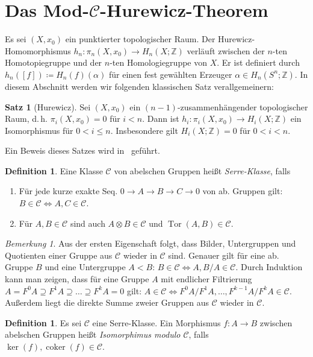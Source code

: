 \documentclass[11pt, a4paper, german]{article}
\theoremstyle{definition}
\newtheorem{satz}[lem]{Satz}
\newtheorem{defn}[lem]{Definition}
\theoremstyle{remark}
\newtheorem*{bem}{Bemerkung}
\newcommand{\Z}{\mathbb{Z}} %
\DeclareMathOperator{\coker}{coker} %
\DeclareMathOperator{\Tor}{Tor} %
\newcommand{\SC}{\mathcal{C}} %
\renewcommand{\dh}{d.\,h.} %
\begin{document}
\section{Das Mod-$\SC$-Hurewicz-Theorem}

Es sei $(X, x_0)$ ein punktierter topologischer Raum.
Der Hurewicz-Homomorphismus $h_n : \pi_n(X, x_0) \to H_n(X; \Z)$ verläuft zwischen der $n$-ten Homotopiegruppe und der $n$-ten Homologiegruppe von $X$.
Er ist definiert durch $h_n([f]) \coloneqq H_n(f)(\alpha)$ für einen fest gewählten Erzeuger $\alpha \in H_n(S^n; \Z)$.
In diesem Abschnitt werden wir folgenden klassischen Satz verallgemeinern:

\begin{satz}[Hurewicz]
  Sei $(X, x_0)$ ein $(n{-}1)$-zusammenhängender topologischer Raum, \dh{} $\pi_i(X, x_0) = 0$ für $i < n$.
  Dann ist $h_i : \pi_i(X, x_0) \to H_i(X; \Z)$ ein Isomorphismus für $0 < i \leq n$.
  Insbesondere gilt $H_i(X; \Z) = 0$ für $0 < i < n$.
\end{satz}

Ein Beweis dieses Satzes wird in~\cite[\mbox{}4.32]{hatcher:at} geführt.

\begin{defn}\label{serre-class}
  Eine Klasse $\SC$ von abelschen Gruppen heißt \emph{Serre-Klasse}, falls
  \begin{enumerate}
    \item Für jede kurze exakte Seq. $0 \to A \to B \to C \to 0$ von ab. Gruppen gilt: $B \in \SC \Leftrightarrow A, C \in \SC$.
    \item Für $A, B \in \SC$ sind auch $A \otimes B \in \SC$ und $\Tor(A, B) \in \SC$.
  \end{enumerate}
\end{defn}

\begin{bem}
  Aus der ersten Eigenschaft folgt, dass Bilder, Untergruppen und Quotienten einer Gruppe aus $\SC$ wieder in $\SC$ sind.
  Genauer gilt für eine ab. Gruppe $B$ und eine Untergruppe $A < B$: $B \in \SC \iff A, B/A \in \SC$.
  Durch Induktion kann man zeigen, dass für eine Gruppe $A$ mit endlicher Filtrierung
  $A = F^0 A \supseteq F^1 A \supseteq \ldots \supseteq F^k A = 0$
  gilt: $A \in \SC \iff F^0 A / F^1 A, \ldots, F^{k-1} A / F^k A \in \SC$.
  Außerdem liegt die direkte Summe zweier Gruppen aus $\SC$ wieder in $\SC$.
\end{bem}

\begin{defn}
  Es sei $\SC$ eine Serre-Klasse.
  Ein Morphismus $f : A \to B$ zwischen abelschen Gruppen heißt \emph{Isomorphimus modulo $\SC$}, falls $\ker(f), \coker(f) \in \SC$. \\
\end{defn}
\end{document}
